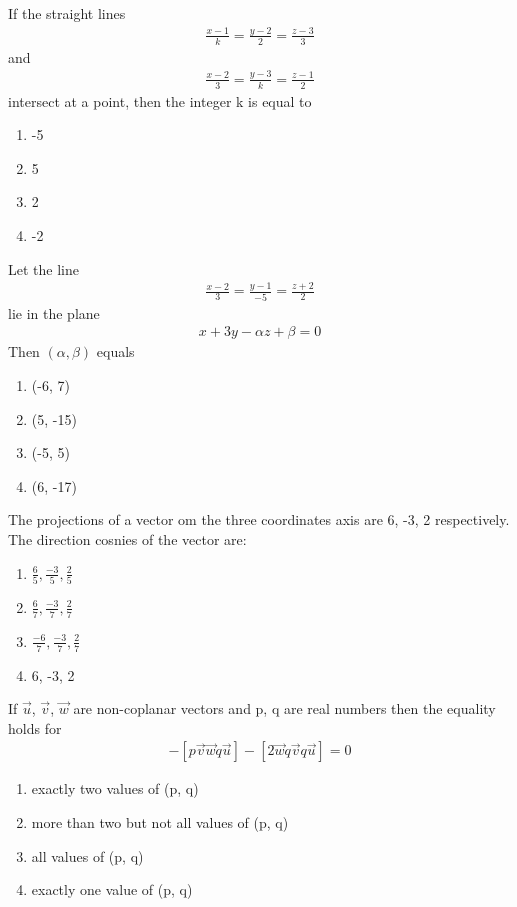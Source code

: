 \item If the straight lines 
\begin{align*}
\frac{x - 1}{k} = \frac{y - 2}{2} = \frac{z - 3}{3}
\end{align*}
and 
\begin{align*}
\frac{x - 2}{3} = \frac{y - 3}{k} = \frac{z - 1}{2}
\end{align*}
intersect at a point, then the integer k is equal to
\begin{enumerate}
\item -5
\item 5
\item 2
\item -2
\end{enumerate}

\item Let the line
\begin{align*}
\frac{x - 2}{3} = \frac{y - 1}{-5} = \frac{z + 2}{2}
\end{align*}
lie in the plane 
\begin{align*}
x + 3y - \alpha z + \beta = 0
\end{align*}
Then $(\alpha, \beta)$ equals
\begin{enumerate}
\item (-6, 7)
\item (5, -15)
\item (-5, 5)
\item (6, -17)
\end{enumerate}

\item The projections of a vector om the three coordinates axis are 6, -3, 2 respectively. The direction cosnies of the vector are:
\begin{enumerate}
\item $\frac{6}{5}, \frac{-3}{5}, \frac{2}{5}$
\item $\frac{6}{7}, \frac{-3}{7}, \frac{2}{7}$
\item $\frac{-6}{7}, \frac{-3}{7}, \frac{2}{7}$
\item 6, -3, 2
\end{enumerate}

\item If $\overrightarrow{u}$, $\overrightarrow{v}$, $\overrightarrow{w}$ are non-coplanar vectors and p, q are real numbers then the equality holds for
\begin{align*}
[3\overrightarrow{u}p\overrightarrow{v}p\overrightarrow{w}] - [p\overrightarrow{v}\overrightarrow{w}q\overrightarrow{u} ] - [2\overrightarrow{w}q\overrightarrow{v}q\overrightarrow{u}] = 0
\end{align*}
\begin{enumerate}
\item exactly two values of (p, q)
\item more than two but not all values of (p, q)
\item all values of (p, q)
\item exactly one value of (p, q)
\end{enumerate}

